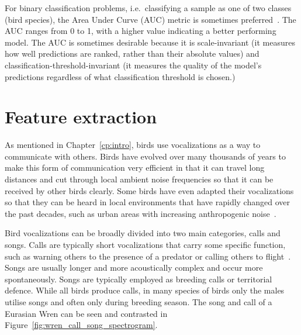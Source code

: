 For binary classification problems, i.e.\ classifying a sample as one of two
classes (bird species), the Area Under Curve (AUC) metric is sometimes
preferred~\cite{leng2014multi}. The AUC ranges from 0 to 1, with a higher value
indicating a better performing model. The AUC is sometimes desirable because it
is scale-invariant (it measures how well predictions are ranked, rather than
their absolute values) and classification-threshold-invariant (it measures the
quality of the model's predictions regardless of what classification threshold
is chosen.)

\section{Feature extraction}

As mentioned in Chapter~\ref{cp:intro}, birds use vocalizations as a way to
communicate with others. Birds have evolved over many thousands of years to
make this form of communication very efficient in that it can travel long
distances and cut through local ambient noise frequencies so that it can be
received by other birds clearly. Some birds have even adapted their
vocalizations so that they can be heard in local environments that have rapidly
changed over the past decades, such as urban areas with increasing anthropogenic
noise~\cite{luther2010urban}.

Bird vocalizations can be broadly divided into two main categories, calls and
songs. Calls are typically short vocalizations that carry some specific
function, such as warning others to the presence of a predator or calling others
to flight~\cite{MARLER2004132}. Songs are usually longer and more acoustically
complex and occur more spontaneously. Songs are typically employed as breeding
calls or territorial defence. While all birds produce calls, in many species of
birds only the males utilise songs and often only during breeding season. The
song and call of a Eurasian Wren can be seen and contrasted in
Figure~\ref{fig:wren_call_song_spectrogram}.

